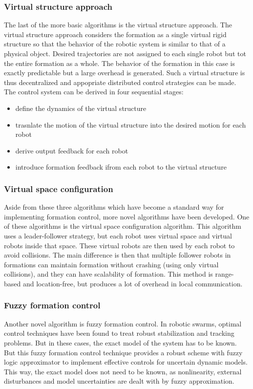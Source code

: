 \subsubsection{Virtual structure approach}
The last of the more basic algorithms is the virtual structure approach. 
The virtual structure approach considers the formation as a single virtual rigid structure so that the behavior of the robotic system is similar to that of a physical object. 
Desired trajectories are not assigned to each single robot but tot the entire formation as a whole. 
The behavior of the formation in this case is exactly predictable but a large overhead is generated. \cite{consolini2008leader}
Such a virtual structure is thus decentralized and appopriate distributed control strategies can be made. \cite{ren2004decentralized}
The control system can be derived in four sequential stages: \cite{do2007nonlinear}
\begin{itemize}
	\item define the dynamics of the virtual structure 
	\item trasnlate the motion of the virtual structure into the desired motion for each robot
	\item derive output feedback for each robot
	\item introduce formation feedback ifrom each robot to the virtual structure
\end{itemize} 

\subsubsection{Virtual space configuration}
Aside from these three algorithms which have become a standard way for implementing formation control, more novel algorithms have been developed. 
One of these algorithms is the virtual space configuration algorithm. \cite{wee2013formation}
This algorithm uses a leader-follower strategy, but each robot uses virtual space and virtual robots inside that space.
These virtual robots are then used by each robot to avoid collisions. 
The main difference is then that multiple follower robots in formations can maintain formation without crashing (using only virtual collisions), and they can have scalability of formation. 
This method is range-based and location-free, but produces a lot of overhead in local communication.

\subsubsection{Fuzzy formation control}
Another novel algorithm is fuzzy formation control.\cite{ranjbar2012novel}
In robotic swarms, optimal control techniques have been found to treat robust stabilization and tracking problems. 
But in these cases, the exact model of the system has to be known. 
But this fuzzy formation control technique provides a robust scheme with fuzzy logic approximator to implement effective controls for uncertain dynamic models.
This way, the exact model does not need to be known, as nonlinearity, external disturbances and model uncertainties are dealt with by fuzzy approximation.

